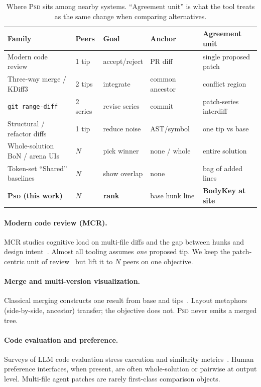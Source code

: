 \documentclass[
  11pt,
  a4paper,
  oneside,
  numbers=noenddot,
  abstract=true,
  headings=normal,
  DIV=11,
  BCOR=0mm,
]{scrartcl}
\theoremstyle{definition}
\theoremstyle{plain}
\theoremstyle{remark}
\newcommand{\PSD}{\textsc{Psd}}
\begin{document}
\begin{table}[t]
\centering
\caption{Where \PSD{} sits among nearby systems. ``Agreement unit'' is what
the tool treats as the same change when comparing alternatives.}
\label{tab:position}
\begin{tabular}{@{}p{2.6cm}p{1.6cm}p{2.0cm}p{2.0cm}p{3.4cm}@{}}
\toprule
\textbf{Family} & \textbf{Peers} & \textbf{Goal} & \textbf{Anchor} & \textbf{Agreement unit} \\
\midrule
Modern code review
  & 1 tip & accept/reject & PR diff & single proposed patch \\
Three-way merge / KDiff3
  & 2 tips & integrate & common ancestor & conflict region \\
\texttt{git range-diff}
  & 2 series & revise series & commit & patch-series interdiff \\
Structural / refactor diffs
  & 1 tip & reduce noise & AST/symbol & one tip vs base \\
Whole-solution BoN / arena UIs
  & $N$ & pick winner & none / whole & entire solution \\
Token-set ``Shared'' baselines
  & $N$ & show overlap & none & bag of added lines \\
\textbf{\PSD{} (this work)}
  & $N$ & \textbf{rank} & base hunk line & \textbf{BodyKey at site} \\
\bottomrule
\end{tabular}
\end{table}

\paragraph{Modern code review (MCR).}
MCR studies cognitive load on multi-file diffs and the gap between hunks
and design intent~\cite{bacchelli2013expectations,sadowski2018modern,wang2024roadmap}.
Almost all tooling assumes \emph{one} proposed tip. We keep the
patch-centric unit of review~\cite{janestreet2013patch} but lift it to
$N$ peers on one objective.

\paragraph{Merge and multi-version visualization.}
Classical merging constructs one result from base and
tips~\cite{mens2002survey,khanna2007unified}. Layout metaphors (side-by-side,
ancestor) transfer; the objective does not. \PSD{} never emits a merged
tree.

\paragraph{Code evaluation and preference.}
Surveys of LLM code evaluation stress execution and similarity
metrics~\cite{zheng2024survey,effibench}. Human preference interfaces, when
present, are often whole-solution or pairwise at output level. Multi-file
agent patches are rarely first-class comparison objects.
\end{document}
